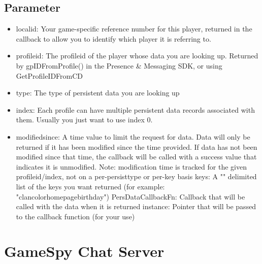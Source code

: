 \documentclass[oneside,titlepage,a4paper]{Definition/retrospy} %
\begin{document}
\chapter{Parameter}
\begin{itemize}
	\item localid: Your game-specific reference number for this player, returned in the callback
	to allow you to identify which player it is referring to.
	\item profileid: The profileid of the player whose data you are looking up. 
	Returned by gpIDFromProfile() in the Presence \& Messaging SDK, or using GetProfileIDFromCD
\item	type: The type of persistent data you are looking up
\item	index: Each profile can have multiple persistent data records associated with them. Usually you
	just want to use index 0.
\item	modifiedsince: A time value to limit the request for data. Data will only be returned if it has been
	modified since the time provided. If data has not been modified since that time, the callback will be
	called with a success value that indicates it is unmodified.
Note: modification time is tracked for the given profileid/index, not on a per-persisttype or per-key basis
	keys: A "\tbs" delimited list of the keys you want returned (for example: "\tbs clan\tbs color\tbs homepage\tbs birthday")
	PersDataCallbackFn: Callback that will be called with the data when it is returned
	instance: Pointer that will be passed to the callback function (for your use)
\end{itemize}




\part{GameSpy Chat Server}
\end{document}
